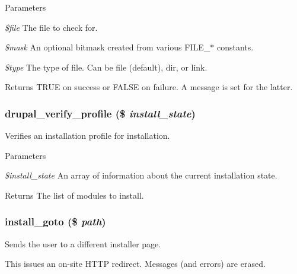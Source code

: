 \begin{DoxyParams}{Parameters}
\item[{\em \$file}]The file to check for. \item[{\em \$mask}]An optional bitmask created from various FILE\_\-$\ast$ constants. \item[{\em \$type}]The type of file. Can be file (default), dir, or link.\end{DoxyParams}
\begin{DoxyReturn}{Returns}
TRUE on success or FALSE on failure. A message is set for the latter. 
\end{DoxyReturn}
\hypertarget{install_8inc_aa29b37a58b07628a4fd9714c2f9817ab}{
\subsubsection[{drupal\_\-verify\_\-profile}]{\setlength{\rightskip}{0pt plus 5cm}drupal\_\-verify\_\-profile (\$ {\em install\_\-state})}}
\label{install_8inc_aa29b37a58b07628a4fd9714c2f9817ab}
Verifies an installation profile for installation.


\begin{DoxyParams}{Parameters}
\item[{\em \$install\_\-state}]An array of information about the current installation state.\end{DoxyParams}
\begin{DoxyReturn}{Returns}
The list of modules to install. 
\end{DoxyReturn}
\hypertarget{install_8inc_a8500b736c9651e3947265d35fc6ab920}{
\subsubsection[{install\_\-goto}]{\setlength{\rightskip}{0pt plus 5cm}install\_\-goto (\$ {\em path})}}
\label{install_8inc_a8500b736c9651e3947265d35fc6ab920}
Sends the user to a different installer page.

This issues an on-\/site HTTP redirect. Messages (and errors) are erased.


